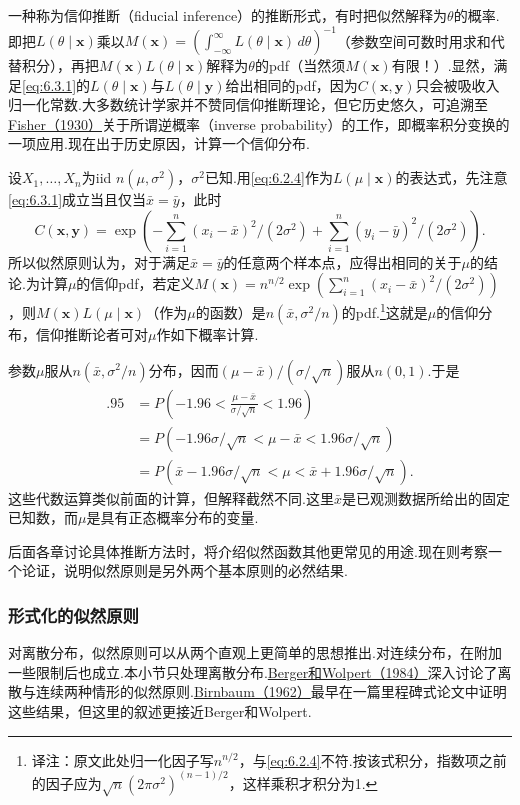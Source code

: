 一种称为信仰推断（fiducial inference）的推断形式，有时把似然解释为$\theta$的概率.即把$L(\theta\mid\boldsymbol x)$乘以$M(\boldsymbol x)=(\int_{-\infty}^{\infty}L(\theta\mid\boldsymbol x)\,d\theta)^{-1}$（参数空间可数时用求和代替积分），再把$M(\boldsymbol x)L(\theta\mid\boldsymbol x)$解释为$\theta$的pdf（当然须$M(\boldsymbol x)$有限！）.显然，满足\eqref{eq:6.3.1}的$L(\theta\mid\boldsymbol x)$与$L(\theta\mid\boldsymbol y)$给出相同的pdf，因为$C(\boldsymbol x,\boldsymbol y)$只会被吸收入归一化常数.大多数统计学家并不赞同信仰推断理论，但它历史悠久，可追溯至\hyperref[bib:source124]{Fisher（1930）}关于所谓逆概率（inverse probability）的工作，即概率积分变换的一项应用.现在出于历史原因，计算一个信仰分布.
\begin{example}[正态信仰分布]\label{ex:6.3.3}
设$X_1,\ldots,X_n$为iid $n(\mu,\sigma^2)$，$\sigma^2$已知.用\eqref{eq:6.2.4}作为$L(\mu\mid\boldsymbol x)$的表达式，先注意\eqref{eq:6.3.1}成立当且仅当$\bar x=\bar y$，此时
$$C(\boldsymbol x,\boldsymbol y)=\exp\left(-\sum_{i=1}^n(x_i-\bar x)^2/(2\sigma^2)+\sum_{i=1}^n(y_i-\bar y)^2/(2\sigma^2)\right).$$
所以似然原则认为，对于满足$\bar x=\bar y$的任意两个样本点，应得出相同的关于$\mu$的结论.为计算$\mu$的信仰pdf，若定义$M(\boldsymbol x)=n^{n/2}\exp(\sum_{i=1}^n(x_i-\bar x)^2/(2\sigma^2))$，则$M(\boldsymbol x)L(\mu\mid\boldsymbol x)$（作为$\mu$的函数）是$n(\bar x,\sigma^2/n)$的pdf.\footnote{译注：原文此处归一化因子写$n^{n/2}$，与\eqref{eq:6.2.4}不符.按该式积分，指数项之前的因子应为$\sqrt n(2\pi\sigma^2)^{(n-1)/2}$，这样乘积才积分为1.}这就是$\mu$的信仰分布，信仰推断论者可对$\mu$作如下概率计算.

参数$\mu$服从$n(\bar x,\sigma^2/n)$分布，因而$(\mu-\bar x)/(\sigma/\sqrt n)$服从$n(0,1)$.于是
\begin{align*}
.95&=P\left(-1.96<\frac{\mu-\bar x}{\sigma/\sqrt n}<1.96\right)\\
&=P(-1.96\sigma/\sqrt n<\mu-\bar x<1.96\sigma/\sqrt n)\\
&=P(\bar x-1.96\sigma/\sqrt n<\mu<\bar x+1.96\sigma/\sqrt n).
\end{align*}
这些代数运算类似前面的计算，但解释截然不同.这里$\bar x$是已观测数据所给出的固定已知数，而$\mu$是具有正态概率分布的变量.
\end{example}
后面各章讨论具体推断方法时，将介绍似然函数其他更常见的用途.现在则考察一个论证，说明似然原则是另外两个基本原则的必然结果.
\subsubsection{形式化的似然原则}\label{sec:6.3.2}
对离散分布，似然原则可以从两个直观上更简单的思想推出.对连续分布，在附加一些限制后也成立.本小节只处理离散分布.\hyperref[bib:source22]{Berger和Wolpert（1984）}深入讨论了离散与连续两种情形的似然原则.\hyperref[bib:source35]{Birnbaum（1962）}最早在一篇里程碑式论文中证明这些结果，但这里的叙述更接近Berger和Wolpert.

